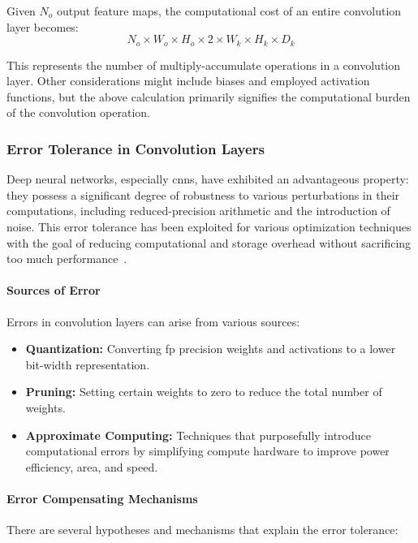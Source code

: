 Given \( N_o \) output feature maps, the computational cost of an entire convolution layer becomes:
\begin{equation}
N_o \times W_o \times H_o \times 2 \times W_k \times H_k \times D_k
\end{equation}

This represents the number of multiply-accumulate operations in a convolution layer. Other considerations might include biases and employed activation functions, but the above calculation primarily signifies the computational burden of the convolution operation.

\subsubsection{Error Tolerance in Convolution Layers}

Deep neural networks, especially \glspl{cnn}, have exhibited an advantageous property: they possess a significant degree of robustness to various perturbations in their computations, including reduced-precision arithmetic and the introduction of noise. This error tolerance has been exploited for various optimization techniques with the goal of reducing computational and storage overhead without sacrificing too much performance~\cite{han2015deep}.

\paragraph{Sources of Error}

Errors in convolution layers can arise from various sources:
\begin{itemize}
	\item \textbf{Quantization:} Converting \gls{fp} precision weights and activations to a lower bit-width representation.
	\item \textbf{Pruning:} Setting certain weights to zero to reduce the total number of weights.
	\item \textbf{Approximate Computing:} Techniques that purposefully introduce computational errors by simplifying compute hardware to improve power efficiency, area, and speed.
\end{itemize}

\paragraph{Error Compensating Mechanisms}

There are several hypotheses and mechanisms that explain the error tolerance:

